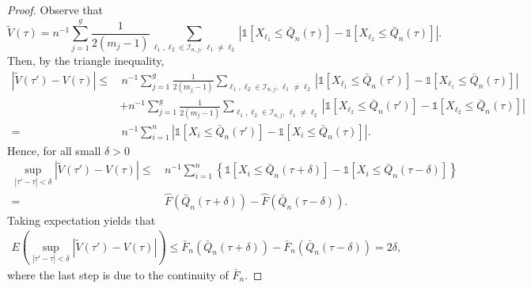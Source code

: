 \documentclass[12pt]{article}
\theoremstyle{remark}
\begin{document}
\begin{proof}
	Observe that
	\begin{equation*}
		\widetilde{V}(\tau)=n^{-1}\sum_{j=1}^{g}\frac{1}{2(m_j-1)}\sum_{\ell_1,\ell_2\in \mathcal{I}_{n,j},\, \ell_1 \neq \ell_2}\left| \mathds{1}\left[ X_{\ell_1}\leq \bar{Q}_{n}(\tau)\right] 
		-\mathds{1}\left[ X_{\ell_2}\leq \bar{Q}_{n}(\tau)\right]\right| .
	\end{equation*}
	Then, by the triangle inequality,
	\begin{align*}
		\left| \widetilde{V}(\tau')-V(\tau)\right|
		\leq&\, n^{-1}\sum_{j=1}^{g}\frac{1}{2(m_j-1)}\sum_{\ell_1,\ell_2\in \mathcal{I}_{n,j},\, \ell_1 \neq \ell_2 }
		\left| \mathds{1}\left[ X_{\ell_1}\leq \bar{Q}_{n}(\tau')\right] 
		-\mathds{1}\left[ X_{\ell_1}\leq \bar{Q}_{n}(\tau)\right] \right|\\
		&+n^{-1}\sum_{j=1}^{g}\frac{1}{2(m_j-1)}\sum_{\ell_1,\ell_2\in \mathcal{I}_{n,j}, \, \ell_1 \neq \ell_2}
		\left| \mathds{1}\left[ X_{\ell_2}\leq \bar{Q}_{n}(\tau')\right] 
		-\mathds{1}\left[ X_{\ell_2}\leq \bar{Q}_{n}(\tau)\right] \right|\\
		=&\, n^{-1}\sum_{i=1}^{n}
		\left| \mathds{1}\left[ X_{i}\leq \bar{Q}_{n}(\tau')\right] 
		-\mathds{1}\left[ X_{i}\leq \bar{Q}_{n}(\tau)\right] \right|.
	\end{align*}
	Hence, for all small $\delta>0$
	\begin{align*}
		\sup_{|\tau'-\tau|<\delta}\left| \widetilde{V}(\tau')-V(\tau)\right|
		\leq&\, n^{-1}\sum_{i=1}^{n}\left\lbrace \mathds{1}\left[ X_{i}\leq \bar{Q}_{n}(\tau+\delta)\right]
		-\mathds{1}\left[ X_{i}\leq \bar{Q}_{n}(\tau-\delta)\right]\right\rbrace\\
		=&\, \widehat{F}\left(\bar{Q}_{n}(\tau+\delta) \right)-\widehat{F}\left(\bar{Q}_{n}(\tau-\delta) \right).
	\end{align*}
	Taking expectation yields that
	\begin{align*}
		E\left( \sup_{|\tau'-\tau|<\delta}\left| \widetilde{V}(\tau')-V(\tau)\right|\right) 
		\leq \bar{F}_n\left(\bar{Q}_{n}(\tau+\delta) \right)-\bar{F}_n\left(\bar{Q}_{n}(\tau-\delta) \right)
		=2\delta,
	\end{align*}
	where the last step is due to the continuity of $\bar{F}_n$.
\end{proof}
\end{document}
